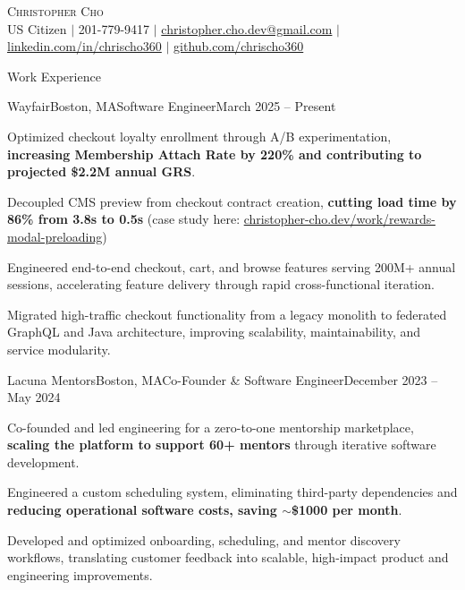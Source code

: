 \documentclass{resume}
\begin{document}
\begin{center}
  {\huge \scshape Christopher Cho} \\
  \small
  US Citizen $|$
  201-779-9417 $|$
  \href{mailto:christopher.cho.dev@gmail.com}{christopher.cho.dev@gmail.com} $|$
  \href{https://linkedin.com/in/chrischo360}{linkedin.com/in/chrischo360} $|$
  \href{https://github.com/chrischo360}{github.com/chrischo360}
\end{center}

\begin{rSection}{Work Experience}
  \begin{rSubsection}{Wayfair}{Boston, MA}{Software Engineer}{March 2025 -- Present}
    \item Optimized checkout loyalty enrollment through A/B experimentation, \textbf{increasing Membership Attach Rate by 220\% and contributing to projected \$2.2M annual GRS}.
    \item Decoupled CMS preview from checkout contract creation, \textbf{cutting load time by 86\% from 3.8s to 0.5s} (case study here: \href{https://www.christopher-cho.dev/work/rewards-modal-preloading}{christopher-cho.dev/work/rewards-modal-preloading})
    \item Engineered end-to-end checkout, cart, and browse features serving 200M+ annual sessions, accelerating feature delivery through rapid cross-functional iteration.
    \item Migrated high-traffic checkout functionality from a legacy monolith to federated GraphQL and Java architecture, improving scalability, maintainability, and service modularity.
  \end{rSubsection}

  \begin{rSubsection}{Lacuna Mentors}{Boston, MA}{Co-Founder \& Software Engineer}{December 2023 -- May 2024}
    \item Co-founded and led engineering for a zero-to-one mentorship marketplace, \textbf{scaling the platform to support 60+ mentors} through iterative software development.
    \item Engineered a custom scheduling system, eliminating third-party dependencies and \textbf{reducing operational software costs, saving $\sim$\$1000 per month}.
    \item Developed and optimized onboarding, scheduling, and mentor discovery workflows, translating customer feedback into scalable, high-impact product and engineering improvements.
  \end{rSubsection}


\end{rSection}
\end{document}
